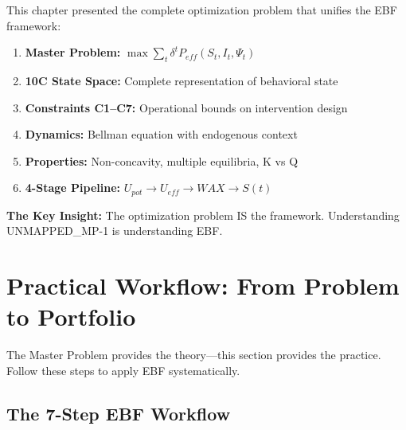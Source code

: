 This chapter presented the complete optimization problem that unifies the EBF framework:

\begin{enumerate}
    \item \textbf{Master Problem:} $\max \sum_t \delta^t P_{eff}(S_t, I_t, \Psi_t)$
    \item \textbf{10C State Space:} Complete representation of behavioral state
    \item \textbf{Constraints C1--C7:} Operational bounds on intervention design
    \item \textbf{Dynamics:} Bellman equation with endogenous context
    \item \textbf{Properties:} Non-concavity, multiple equilibria, K vs Q
    \item \textbf{4-Stage Pipeline:} $U_{pot} \to U_{eff} \to WAX \to S(t)$
\end{enumerate}

\textbf{The Key Insight:} The optimization problem IS the framework. Understanding UNMAPPED_MP-1 is understanding EBF.


\section{Practical Workflow: From Problem to Portfolio}
\label{sec:25-workflow}

The Master Problem provides the theory---this section provides the practice. Follow these steps to apply EBF systematically.

\subsection{The 7-Step EBF Workflow}
\label{sec:25-7step}

